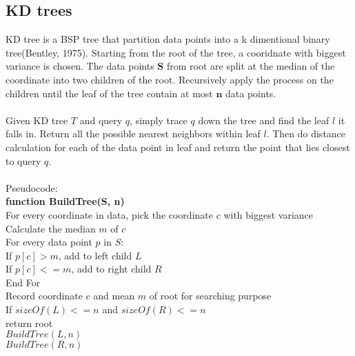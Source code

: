 \documentclass[paper=letter, fontsize=12pt]{article} %
\begin{document}
\subsection{KD trees}
KD tree is a BSP tree that partition data points into a k dimentional binary tree(Bentley, 1975). Starting from the root of the tree, a cooridnate with biggest variance is chosen. The data points $\mathbf S$ from root are split at the median of the coordinate into two children of the root. Recursively apply the process on the children until the leaf of the tree contain at most $\mathbf n$ data points.
\\~\\
Given KD tree $T$ and query $q$, simply trace $q$ down the tree and find the leaf $l$ it falls in. Return all the possible nearest neighbors within leaf $l$. Then do distance calculation for each of the data point in leaf and return the point that lies closest to query $q$.
\\~\\
Pseudocode:\\
\hspace*{1em} \textbf{function BuildTree(S, n)}\\
\hspace*{2em} For every coordinate in data, pick the coordinate  $c$ with biggest variance\\
\hspace*{2em} Calculate the median $m$ of $c$\\
\hspace*{2em} For every data point $p$ in $S$:\\
\hspace*{3em} If $p[c] > m$, add to left child $L$\\
\hspace*{3em} If $p[c] <= m$, add to right child $R$\\
\hspace*{2em} End For\\
\hspace*{2em} Record coordinate $c$ and mean $m$ of root for searching purpose\\
\hspace*{2em} If $sizeOf(L)<=n$ and $sizeOf(R) <=n$\\
\hspace*{3em} return root\\
\hspace*{2em} $BuildTree(L, n)$\\
\hspace*{2em} $BuildTree(R, n)$\\
\end{document}
